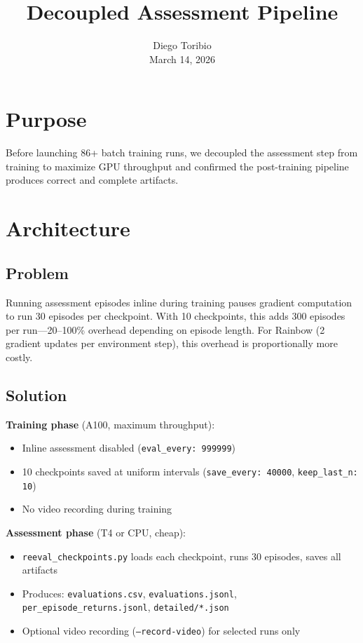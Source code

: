 \documentclass[11pt]{article}
\title{Decoupled Assessment Pipeline}
\author{Diego Toribio\\[0.3em]{\normalsize March 14, 2026}}
\date{\vspace{-2.5em}}
\begin{document}
\maketitle
\thispagestyle{empty}

\section{Purpose}

Before launching 86+ batch training runs, we decoupled the
assessment step from training to maximize GPU throughput and
confirmed the post-training pipeline produces correct and complete
artifacts.


\section{Architecture}

\subsection{Problem}

Running assessment episodes inline during training pauses gradient
computation to run 30 episodes per checkpoint. With 10 checkpoints,
this adds 300 episodes per run---20--100\% overhead depending on
episode length. For Rainbow (2 gradient updates per environment
step), this overhead is proportionally more costly.

\subsection{Solution}

\textbf{Training phase} (A100, maximum throughput):
\begin{itemize}[leftmargin=2em, itemsep=0.1em]
  \item Inline assessment disabled
        (\texttt{eval\_every: 999999})
  \item 10 checkpoints saved at uniform intervals
    (\texttt{save\_every: 40000}, \texttt{keep\_last\_n: 10})
  \item No video recording during training
\end{itemize}

\textbf{Assessment phase} (T4 or CPU, cheap):
\begin{itemize}[leftmargin=2em, itemsep=0.1em]
  \item \texttt{reeval\_checkpoints.py} loads each checkpoint,
    runs 30 episodes, saves all artifacts
  \item Produces: \texttt{evaluations.csv},
    \texttt{evaluations.jsonl},
    \texttt{per\_episode\_returns.jsonl},
    \texttt{detailed/*.json}
  \item Optional video recording (\texttt{--record-video}) for
    selected runs only
\end{itemize}
\end{document}

